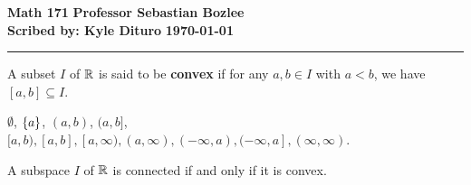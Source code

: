 \documentclass[12pt, twosided]{article}
\begin{document}
\noindent \textbf{Math 171} \hfill \textbf{Professor Sebastian Bozlee} \\
\textbf{Scribed by: Kyle Dituro} \hfill \textbf{\today}\hrule
\vspace{.2in}

\begin{df}
  A subset \(I\) of \(\mathbb{R}\) is said to be \textbf{convex} if for any \(a, b \in I\) with \(a < b\), we have \([a,b] \subseteq I\).
\end{df}
\begin{exa}
  \(\emptyset\), \(\left\{ a \right\}\), \((a,b)\), \((a, b]\), \([a,b), [a,b], [a, \infty), (a, \infty), (-\infty, a), (-\infty, a], (\infty, \infty)\).
\end{exa}

\begin{thm}
  A subspace \(I\) of \(\mathbb{R}\) is connected if and only if it is convex.
\end{thm}
\end{document}
